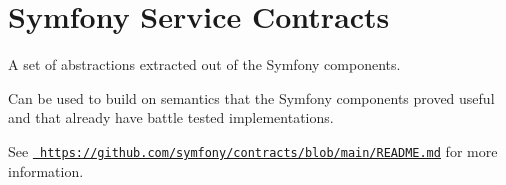 \chapter{Symfony Service Contracts}
\hypertarget{md_vendor_2symfony_2service-contracts_2_r_e_a_d_m_e}{}\label{md_vendor_2symfony_2service-contracts_2_r_e_a_d_m_e}
A set of abstractions extracted out of the Symfony components.

Can be used to build on semantics that the Symfony components proved useful and that already have battle tested implementations.

See \href{https://github.com/symfony/contracts/blob/main/README.md}{\texttt{ https\+://github.\+com/symfony/contracts/blob/main/\+README.\+md}} for more information. 
